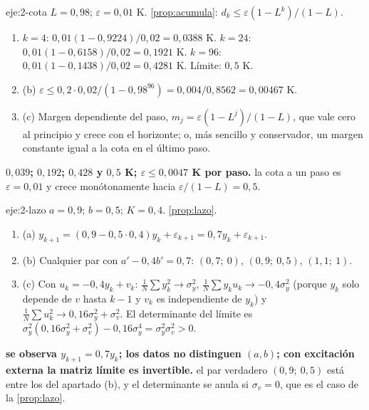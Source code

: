 \begin{solucion}{eje:2-cota}
\datos $L=0{,}98$; $\varepsilon=0{,}01$ K.
\planteamiento \cref{prop:acumula}: $d_k\le\varepsilon(1-L^{k})/(1-L)$.
\pasos
\begin{enumerate}[label=\arabic*.]
  \item $k=4$: $0{,}01(1-0{,}9224)/0{,}02=0{,}0388$ K. $k=24$: $0{,}01(1-0{,}6158)/0{,}02=0{,}1921$ K. $k=96$: $0{,}01(1-0{,}1438)/0{,}02=0{,}4281$ K. Límite: $0{,}5$ K.
  \item (b) $\varepsilon\le0{,}2\cdot0{,}02/(1-0{,}98^{96})=0{,}004/0{,}8562=0{,}00467$ K.
  \item (c) Margen dependiente del paso, $m_j=\varepsilon(1-L^{j})/(1-L)$, que vale cero al principio y crece con el horizonte; o, más sencillo y conservador, un margen constante igual a la cota en el último paso.
\end{enumerate}
\resultado \textbf{$0{,}039$; $0{,}192$; $0{,}428$ y $0{,}5$ K; $\varepsilon\le0{,}0047$ K por paso.}
\comprobacion la cota a un paso es $\varepsilon=0{,}01$ y crece monótonamente hacia $\varepsilon/(1-L)=0{,}5$.
\end{solucion}

\begin{solucion}{eje:2-lazo}
\datos $a=0{,}9$; $b=0{,}5$; $K=0{,}4$.
\planteamiento \cref{prop:lazo}.
\pasos
\begin{enumerate}[label=\arabic*.]
  \item (a) $y_{k+1}=(0{,}9-0{,}5\cdot0{,}4)y_k+\varepsilon_{k+1}=0{,}7y_k+\varepsilon_{k+1}$.
  \item (b) Cualquier par con $a'-0{,}4b'=0{,}7$: $(0{,}7;\ 0)$, $(0{,}9;\ 0{,}5)$, $(1{,}1;\ 1)$.
  \item (c) Con $u_k=-0{,}4y_k+v_k$: $\frac1N\sum y_k^{2}\to\sigma_y^{2}$, $\frac1N\sum y_ku_k\to-0{,}4\sigma_y^{2}$ (porque $y_k$ solo depende de $v$ hasta $k-1$ y $v_k$ es independiente de $y_k$) y $\frac1N\sum u_k^{2}\to0{,}16\sigma_y^{2}+\sigma_v^{2}$. El determinante del límite es $\sigma_y^{2}(0{,}16\sigma_y^{2}+\sigma_v^{2})-0{,}16\sigma_y^{4}=\sigma_y^{2}\sigma_v^{2}>0$.
\end{enumerate}
\resultado \textbf{se observa $y_{k+1}=0{,}7y_k$; los datos no distinguen $(a,b)$; con excitación externa la matriz límite es invertible.}
\comprobacion el par verdadero $(0{,}9;\ 0{,}5)$ está entre los del apartado (b), y el determinante se anula si $\sigma_v=0$, que es el caso de la \cref{prop:lazo}.
\end{solucion}

